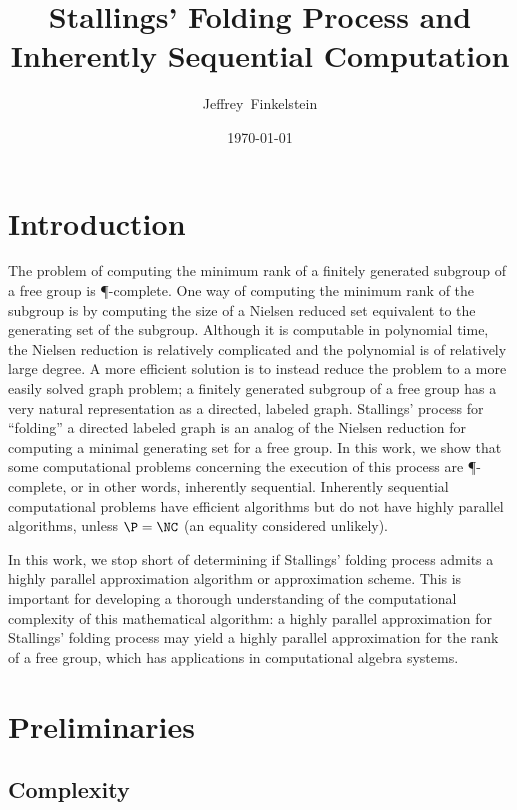 \documentclass{article}
\author{Jef{}frey~Finkelstein}
\title{Stallings' Folding Process and Inherently Sequential Computation}
\date{\today}
\begin{document}
\maketitle


\section{Introduction}

The problem of computing the minimum rank of a finitely generated subgroup of a free group is \P-complete.
One way of computing the minimum rank of the subgroup is by computing the size of a Nielsen reduced set equivalent to the generating set of the subgroup.
Although it is computable in polynomial time, the Nielsen reduction is relatively complicated and the polynomial is of relatively large degree.
A more efficient solution is to instead reduce the problem to a more easily solved graph problem; a finitely generated subgroup of a free group has a very natural representation as a directed, labeled graph.
Stallings' process for ``folding'' a directed labeled graph \cite[Algorithm~5.4]{stallings83} is an analog of the Nielsen reduction for computing a minimal generating set for a free group.
In this work, we show that some computational problems concerning the execution of this process are \P-complete, or in other words, inherently sequential.
Inherently sequential computational problems have efficient algorithms but do not have highly parallel algorithms, unless $\P = \NC$ (an equality considered unlikely).

In this work, we stop short of determining if Stallings' folding process admits a highly parallel approximation algorithm or approximation scheme.
This is important for developing a thorough understanding of the computational complexity of this mathematical algorithm: a highly parallel approximation for Stallings' folding process may yield a highly parallel approximation for the rank of a free group, which has applications in computational algebra systems.

\section{Preliminaries}

\subsection{Complexity}
\end{document}
